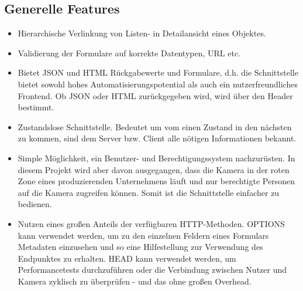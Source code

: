 \subsection{Generelle Features}
\begin{itemize}
\item Hierarchische Verlinkung von Listen- in Detailansicht eines Objektes.
\item Validierung der Formulare auf korrekte Datentypen, URL etc.
\item Bietet JSON und HTML Rückgabewerte und Formulare, d.h. die Schnittstelle bietet sowohl hohes Automatisierungspotential als auch ein nutzerfreundliches Frontend. Ob JSON oder HTML zurückgegeben wird, wird über den Header bestimmt.
\item Zustandslose Schnittstelle. Bedeutet um vom einen Zustand in den nächsten zu kommen, sind dem Server bzw. Client alle nötigen Informationen bekannt. 
\item Simple Möglichkeit, ein Benutzer- und Berechtigungssystem nachzurüsten. In diesem Projekt wird aber davon ausgegangen, dass die Kamera in der roten Zone eines produzierenden Unternehmens läuft und nur berechtigte Personen auf die Kamera zugreifen können. Somit ist die Schnittstelle einfacher zu bedienen.
\item Nutzen eines großen Anteils der verfügbaren HTTP-Methoden. OPTIONS kann verwendet werden, um zu den einzelnen Feldern eines Formulars Metadaten einzusehen und so eine Hilfestellung zur Verwendung des Endpunktes zu erhalten. HEAD kann verwendet werden, um Performancetests durchzuführen oder die Verbindung zwischen Nutzer und Kamera zyklisch zu überprüfen - und das ohne großen Overhead.
\end{itemize}

